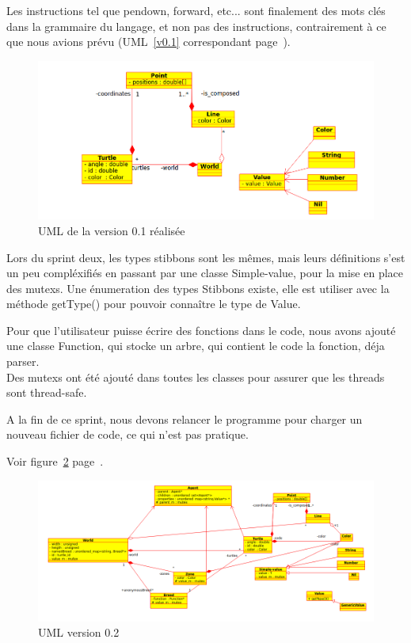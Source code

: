 Les instructions tel que pendown, forward, etc... sont finalement des mots clés dans la grammaire du langage, et non pas des instructions, contrairement à ce que nous avions prévu (UML~\ref{v0.1} correspondant page~\pageref{v0.1}).\\


\begin{figure}[h]
\caption{\label{v0.1R} UML de la version 0.1 réalisée}
\includegraphics[scale=0.5]{doc/report/uml/v01reel.png}
\end{figure}

Lors du sprint deux, les types stibbons sont les mêmes, mais leurs définitions s'est un peu compléxifiés en passant par une classe Simple-value, pour la mise en place des mutexs. Une énumeration des types Stibbons existe, elle est utiliser avec la méthode getType() pour pouvoir connaître le type de Value.


Pour que l'utilisateur puisse écrire des fonctions dans le code, nous avons ajouté une classe Function, qui stocke un arbre, qui contient le code la fonction, déja parser.
\\ Des mutexs ont été ajouté dans toutes les classes pour assurer que les threads sont thread-safe.


A la fin de ce sprint, nous devons relancer le programme pour charger un nouveau fichier de code, ce qui n'est pas pratique.


Voir figure~\ref{v0.2} page~\pageref{v0.2}.
\begin{figure}[h]
\caption{\label{v0.2} UML version 0.2}
\includegraphics[scale=0.45]{doc/report/uml/v02reel.png}
\end{figure}

